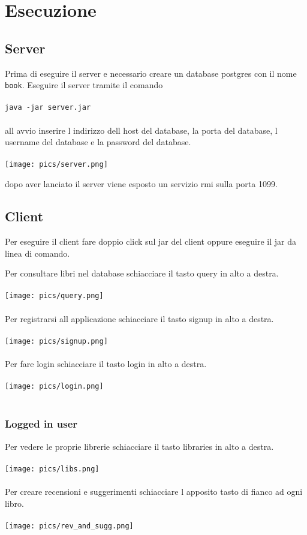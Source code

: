 \documentclass{report}
\begin{document}
\chapter{Esecuzione}
\section{Server}
Prima di eseguire il server e necessario creare un database postgres con il nome \verb+book+. 
Eseguire il server tramite il comando \\ \\ 
\verb+java -jar server.jar+\\ \\
all avvio inserire l indirizzo dell host del database, la porta del database, l username del database e la password del database. \\ \\

\texttt{[image: pics/server.png]}

dopo aver lanciato il server viene esposto un servizio rmi sulla porta 1099.


\section{Client}
Per eseguire il client fare doppio click sul jar del client oppure eseguire il jar da linea di comando.

Per consultare libri nel database schiacciare il tasto query in alto a destra. \\ \\
\texttt{[image: pics/query.png]} \\ \\
Per registrarsi all applicazione schiacciare il tasto signup in alto a destra. \\ \\
\texttt{[image: pics/signup.png]} \\ \\
Per fare login schiacciare il tasto login in alto a destra. \\ \\
\texttt{[image: pics/login.png]} \\ \\

\subsection{Logged in user}
Per vedere le proprie librerie schiacciare il tasto libraries in alto a destra. \\ \\ 
\texttt{[image: pics/libs.png]} \\ \\
Per creare recensioni e suggerimenti schiacciare l apposito tasto di fianco ad ogni libro. \\ \\ 
\texttt{[image: pics/rev\_and\_sugg.png]} \\ \\
\end{document}
